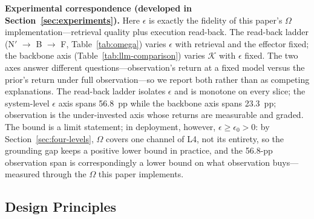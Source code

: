 \textbf{Experimental correspondence (developed in Section~\ref{sec:experiments}).} Here $\epsilon$ is exactly the fidelity of this paper's $\Omega$ implementation---retrieval quality plus execution read-back. The read-back ladder (N$'$ $\to$ B $\to$ F, Table~\ref{tab:omega}) varies $\epsilon$ with retrieval and the effector fixed; the backbone axis (Table~\ref{tab:llm-comparison}) varies $\mathcal{K}$ with $\epsilon$ fixed. The two axes answer different questions---observation's return at a fixed model versus the prior's return under full observation---so we report both rather than as competing explanations. The read-back ladder isolates $\epsilon$ and is monotone on every slice; the system-level $\epsilon$ axis spans 56.8~pp while the backbone axis spans 23.3~pp; observation is the under-invested axis whose returns are measurable and graded. The bound is a limit statement; in deployment, however, $\epsilon \ge \epsilon_0 > 0$: by Section~\ref{sec:four-levels}, $\Omega$ covers one channel of L4, not its entirety, so the grounding gap keeps a positive lower bound in practice, and the 56.8-pp observation span is correspondingly a lower bound on what observation buys---measured through the $\Omega$ this paper implements.

\subsection{Design Principles}
\label{sec:prediction}

